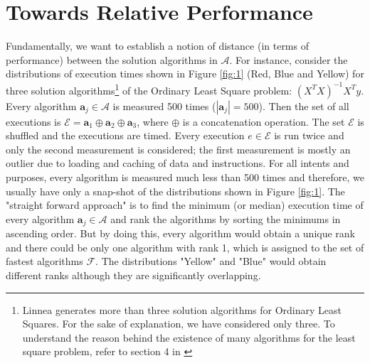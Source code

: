 \documentclass[conference]{IEEEtran}
\begin{document}
\section{Towards Relative Performance}
\label{sec:torel}
Fundamentally, we want to establish a notion of distance (in terms of performance) between the solution algorithms in $\mathcal{A}$. For instance, consider the distributions of execution times shown in Figure \ref{fig:1} (Red, Blue and Yellow) for three solution algorithms\footnote{Linnea generates more than three solution algorithms for Ordinary Least Squares. For the sake of explanation, we have considered only three. To understand the reason behind the existence of many algorithms for the least square problem, refer to section 4 in \cite{barthels2019linnea} } of the Ordinary Least Square problem:  $(X^TX)^{-1}X^{T}y$. 
Every algorithm $\mathbf{a}_j \in \mathcal{A}$ is measured 500 times ($|\mathbf{a}_j| = 500$). Then the set of all executions is $\mathcal{E} = \mathbf{a}_1 \oplus \mathbf{a}_2 \oplus \mathbf{a}_3$, where $\oplus$ is a concatenation operation. The set $\mathcal{E}$ is shuffled and the executions are timed. Every execution $e \in \mathcal{E}$ is run twice and only the second measurement is considered; the first measurement is mostly an outlier due to loading and caching of data and instructions\cite{peise2019elaps}. For all intents and purposes, every algorithm is measured much less than 500 times and therefore, we usually have only a snap-shot of the distributions shown in Figure \ref{fig:1}.
  The "straight forward approach" is to find the minimum (or median) execution time of every algorithm $\mathbf{a}_j \in \mathcal{A}$ and rank the algorithms by sorting the minimums in ascending order\cite{peise2012performance}. But by doing this, every algorithm would obtain a unique rank and there could be only one algorithm with rank 1, which is assigned to the set of fastest algorithms $\mathcal{F}$. The distributions "Yellow" and "Blue" would obtain different ranks although they are significantly overlapping.  
\end{document}
